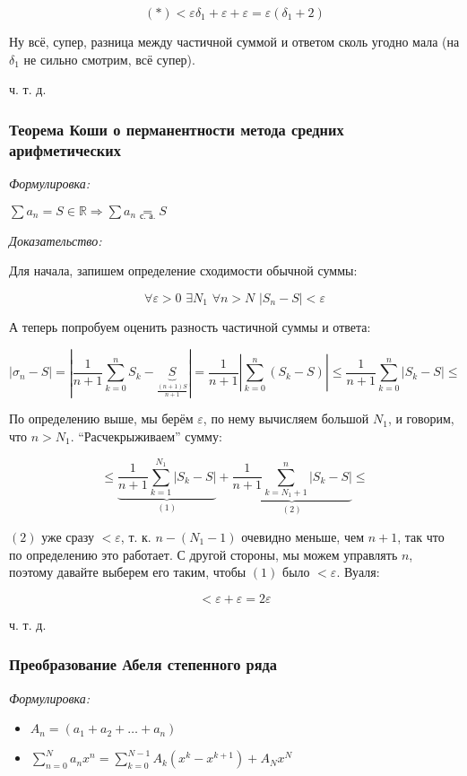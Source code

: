 \documentclass{article}
\def\dbl{\,\,}
\def\eqby#1{\underset{#1}{=}}
\begin{document}
\[(*) < \varepsilon\delta_1 + \varepsilon + \varepsilon = \varepsilon(\delta_1 + 2)\]

Ну всё, супер, разница между частичной суммой и ответом сколь угодно мала (на $\delta_1$ не сильно смотрим, всё супер).

ч. т. д.

\subsubsection{Теорема Коши о перманентности метода средних арифметических}
\textit{Формулировка:}

$\sum a_n = S \in \mathbb{R} \Rightarrow \sum a_n \eqby{\text{с. а.}} S$

\textit{Доказательство:}

Для начала, запишем определение сходимости обычной суммы:

\[\forall \varepsilon > 0 \dbl \exists N_{1} \dbl \forall n > N \dbl |S_n - S| < \varepsilon\]

А теперь попробуем оценить разность частичной суммы и ответа:

\[\left|\sigma_n - S\right| = \left|\frac{1}{n + 1}\sum_{k = 0}^{n}S_k - \underbrace{S}_{\frac{(n + 1)S}{n + 1}}\right| = \frac{1}{n + 1} \left|\sum_{k = 0}^{n} \left(S_k - S\right)\right| \le \frac{1}{n + 1}\sum_{k = 0}^{n}\left|S_k - S\right| \le\]

По определению выше, мы берём $\varepsilon$, по нему вычисляем большой $N_1$, и говорим, что $n > N_{1}$. ``Расчекрыживаем'' сумму:

\[\le \underbrace{\frac{1}{n + 1}\sum_{k = 1}^{N_1} |S_k - S|}_{(1)} + \underbrace{\frac{1}{n + 1}\sum_{k = N_1 + 1}^{n} |S_k - S|}_{(2)} \le \]

$(2)$ уже сразу $< \varepsilon$, т. к. $n - (N_1 - 1)$ очевидно меньше, чем $n + 1$, так что по определению это работает. С другой стороны, мы можем управлять $n$, поэтому давайте выберем его таким, чтобы $(1)$ было $< \varepsilon$. Вуаля: 

\[< \varepsilon + \varepsilon = 2 \varepsilon\]

ч. т. д. 

\subsubsection{Преобразование Абеля степенного ряда}
\textit{Формулировка:}

\begin{itemize}
    \item $A_n = (a_1 + a_2 + \ldots + a_n)$
    \item $\sum_{n = 0}^{N} a_n x^n = \sum_{k = 0}^{N - 1} A_k(x^k - x^{k + 1}) + A_N x^N$
\end{itemize}
\end{document}
